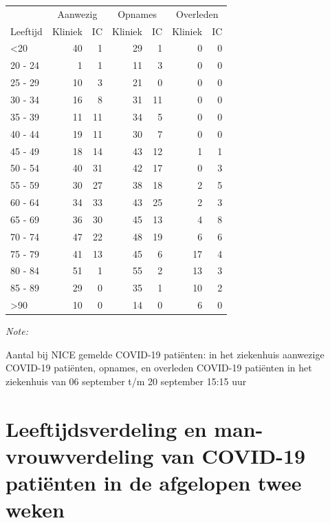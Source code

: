 \documentclass[
  english,
  man,floatsintext]{apa6}
\begin{document}
\begin{table}
\centering\begingroup\fontsize{10}{12}\selectfont

\begin{threeparttable}
\begin{tabular}{lrrrrrr}
\toprule
\multicolumn{1}{c}{ } & \multicolumn{2}{c}{Aanwezig} & \multicolumn{2}{c}{Opnames} & \multicolumn{2}{c}{Overleden} \\
\cmidrule(l{3pt}r{3pt}){2-3} \cmidrule(l{3pt}r{3pt}){4-5} \cmidrule(l{3pt}r{3pt}){6-7}
Leeftijd & Kliniek & IC & Kliniek & IC & Kliniek & IC\\
\midrule
<20 & 40 & 1 & 29 & 1 & 0 & 0\\
20 - 24 & 1 & 1 & 11 & 3 & 0 & 0\\
25 - 29 & 10 & 3 & 21 & 0 & 0 & 0\\
30 - 34 & 16 & 8 & 31 & 11 & 0 & 0\\
35 - 39 & 11 & 11 & 34 & 5 & 0 & 0\\
40 - 44 & 19 & 11 & 30 & 7 & 0 & 0\\
45 - 49 & 18 & 14 & 43 & 12 & 1 & 1\\
50 - 54 & 40 & 31 & 42 & 17 & 0 & 3\\
55 - 59 & 30 & 27 & 38 & 18 & 2 & 5\\
60 - 64 & 34 & 33 & 43 & 25 & 2 & 3\\
65 - 69 & 36 & 30 & 45 & 13 & 4 & 8\\
70 - 74 & 47 & 22 & 48 & 19 & 6 & 6\\
75 - 79 & 41 & 13 & 45 & 6 & 17 & 4\\
80 - 84 & 51 & 1 & 55 & 2 & 13 & 3\\
85 - 89 & 29 & 0 & 35 & 1 & 10 & 2\\
>90 & 10 & 0 & 14 & 0 & 6 & 0\\
\bottomrule
\end{tabular}
\begin{tablenotes}
\item \textit{Note: } 
\item Aantal bij NICE gemelde COVID-19 patiënten: in het ziekenhuis aanwezige COVID-19 patiënten, opnames, en overleden COVID-19 patiënten in het ziekenhuis van 06 september t/m 20 september 15:15 uur
\end{tablenotes}
\end{threeparttable}
\endgroup{}
\end{table}

\newpage

\hypertarget{leeftijdsverdeling-en-man-vrouwverdeling-van-covid-19-patiuxebnten-in-de-afgelopen-twee-weken}{%
\section{Leeftijdsverdeling en man-vrouwverdeling van COVID-19 patiënten in de afgelopen twee weken}\label{leeftijdsverdeling-en-man-vrouwverdeling-van-covid-19-patiuxebnten-in-de-afgelopen-twee-weken}}
\end{document}
